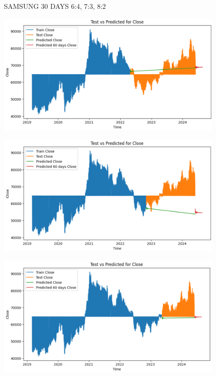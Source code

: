 \documentclass{article}
\begin{document}
\begin{multicols}{2}
\begin{figure}[H]
\begin{minipage}{0.15\textwidth}
    \label{fig:3}
    \end{minipage}
    \caption{SAMSUNG 30 DAYS  6:4, 7:3, 8:2 }
\end{figure}

\begin{figure}[H]
    \centering
    \begin{minipage}{0.15\textwidth}
    \centering
    \includegraphics[width=1\textwidth]{Image/VARMA/SAMSUNG/6_4/60.png}
   
    \label{fig:1}
    \end{minipage}%
    \begin{minipage}{0.15\textwidth}
    \centering
    \includegraphics[width=1\textwidth]{Image/VARMA/SAMSUNG/7_3/60.png}
  
    \label{fig:2}
    \end{minipage}%
    \begin{minipage}{0.15\textwidth}
    \centering
    \includegraphics[width=1\textwidth]{Image/VARMA/SAMSUNG/8_2/60.png}


\end{minipage}
\end{figure}
\end{multicols}
\end{document}
